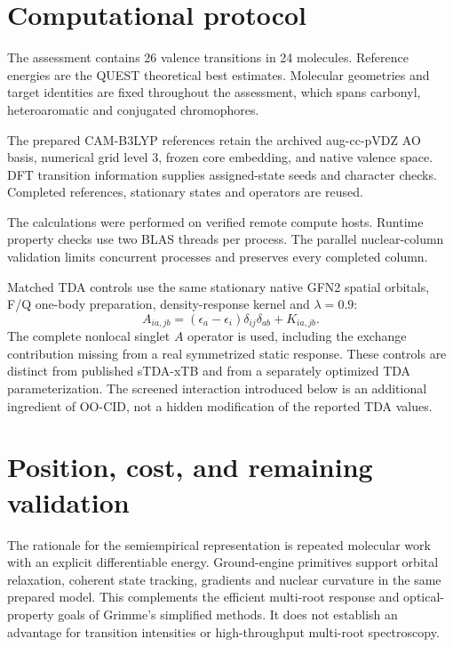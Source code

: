 \documentclass[11pt,a4paper]{article}
\begin{document}
\section{Computational protocol}
The assessment contains 26 valence transitions in 24 molecules. Reference
energies are the QUEST theoretical best estimates.\cite{quest,quest2025}
Molecular geometries and target identities are fixed throughout the
assessment, which spans carbonyl, heteroaromatic and conjugated chromophores.

The prepared CAM-B3LYP references retain the archived aug-cc-pVDZ AO basis,
numerical grid level 3, frozen core embedding, and native valence space.
DFT transition information supplies assigned-state seeds and character checks.
Completed references, stationary states and operators are reused.

The calculations were performed on verified remote compute hosts. Runtime
property checks use two BLAS threads per process. The parallel nuclear-column
validation limits concurrent processes and preserves every completed column.

Matched TDA controls use the same stationary native GFN2 spatial orbitals,
F/Q one-body preparation, density-response kernel and $\lambda=0.9$:
\begin{equation}
 A_{ia,jb}=(\epsilon_a-\epsilon_i)\delta_{ij}\delta_{ab}+K_{ia,jb}.
\end{equation}
The complete nonlocal singlet $A$ operator is used, including the exchange
contribution missing from a real symmetrized static response. These controls
are distinct from published sTDA-xTB and from a separately optimized TDA
parameterization. The screened interaction introduced below is an additional
ingredient of OO-CID, not a hidden modification of the reported TDA values.



\section{Position, cost, and remaining validation}
The rationale for the semiempirical representation is repeated molecular
work with an explicit differentiable energy. Ground-engine primitives
support orbital relaxation, coherent state tracking, gradients and nuclear
curvature in the same prepared model. This complements the efficient
multi-root response and optical-property goals of Grimme's simplified
methods.\cite{tda,stdaxtb2016,std22026} It does not establish an advantage
for transition intensities or high-throughput multi-root spectroscopy.
\end{document}
